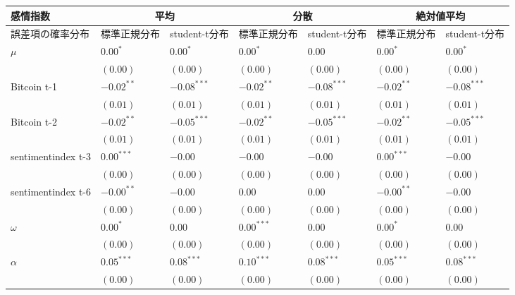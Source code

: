 \begin{landscape}
\begin{table}[]
\begin{tabular}{lllllll}
\hline
感情指数               & \multicolumn{2}{c}{平均}       & \multicolumn{2}{c}{分散}       & \multicolumn{2}{c}{絶対値平均}    \\ \hline
誤差項の確率分布           & 標準正規分布       & student-t分布   & 標準正規分布       & student-t分布   & 標準正規分布       & student-t分布   \\ \hline
$\mu$              & $0.00^{*}$   & $0.00^{*}$    & $0.00^{*}$   & $0.00$        & $0.00^{*}$   & $0.00^{*}$    \\
                   & $(0.00)$     & $(0.00)$      & $(0.00)$     & $(0.00)$      & $(0.00)$     & $(0.00)$      \\
Bitcoin t-1        & $-0.02^{**}$ & $-0.08^{***}$ & $-0.02^{**}$ & $-0.08^{***}$ & $-0.02^{**}$ & $-0.08^{***}$ \\
                   & $(0.01)$     & $(0.01)$      & $(0.01)$     & $(0.01)$      & $(0.01)$     & $(0.01)$      \\
Bitcoin t-2        & $-0.02^{**}$ & $-0.05^{***}$ & $-0.02^{**}$ & $-0.05^{***}$ & $-0.02^{**}$ & $-0.05^{***}$ \\
                   & $(0.01)$     & $(0.01)$      & $(0.01)$     & $(0.01)$      & $(0.01)$     & $(0.01)$      \\
sentimentindex t-3 & $0.00^{***}$ & $-0.00$       & $-0.00$      & $-0.00$       & $0.00^{***}$ & $-0.00$       \\
                   & $(0.00)$     & $(0.00)$      & $(0.00)$     & $(0.00)$      & $(0.00)$     & $(0.00)$      \\
sentimentindex t-6 & $-0.00^{**}$ & $-0.00$       & $0.00$       & $0.00$        & $-0.00^{**}$ & $-0.00$       \\
                   & $(0.00)$     & $(0.00)$      & $(0.00)$     & $(0.00)$      & $(0.00)$     & $(0.00)$      \\
$\omega$           & $0.00^{*}$   & $0.00$        & $0.00^{***}$ & $0.00$        & $0.00^{*}$   & $0.00$        \\
                   & $(0.00)$     & $(0.00)$      & $(0.00)$     & $(0.00)$      & $(0.00)$     & $(0.00)$      \\
$\alpha$           & $0.05^{***}$ & $0.08^{***}$  & $0.10^{***}$ & $0.08^{***}$  & $0.05^{***}$ & $0.08^{***}$  \\
                   & $(0.00)$     & $(0.00)$      & $(0.00)$     & $(0.00)$      & $(0.00)$     & $(0.00)$      \\

\end{tabular}
\end{table}
\end{landscape}
